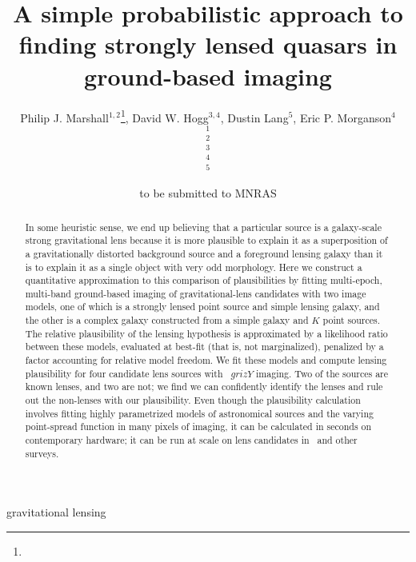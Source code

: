 \documentclass[useAMS,usenatbib]{mn2e}
\title[Finding lensed quasars]
{A simple probabilistic approach to finding 
strongly lensed quasars in ground-based imaging}
\author[]{%
  Philip J. Marshall$^{1,2}$\thanks{\pjmemail},
  David W. Hogg$^{3,4}$,
  Dustin Lang$^{5}$,
  Eric P. Morganson$^{4}$ 
  \medskip\\
  $^1$\oxford\\
  $^2$\kipac\\
  $^3$\nyu\\
  $^4$\mpia\\
  $^5$\cmu
}
\begin{document}
             
\date{to be submitted to MNRAS}
             
\pagerange{\pageref{firstpage}--\pageref{lastpage}}

\maketitle           

\label{firstpage}


\begin{abstract}
In some heuristic sense, we end up believing that a particular source
is a galaxy-scale strong gravitational lens because it is more
plausible to explain it as a superposition of a gravitationally
distorted background source and a foreground lensing galaxy than it is
to explain it as a single object with very odd morphology.  Here we
construct a quantitative approximation to this comparison of
plausibilities by fitting multi-epoch, multi-band ground-based imaging
of gravitational-lens candidates with two image models, one of which
is a strongly lensed point source and simple lensing galaxy, and the
other is a complex galaxy constructed from a simple galaxy and $K$
point sources.  The relative plausibility of the lensing hypothesis is
approximated by a likelihood ratio between these models, evaluated at
best-fit (that is, not marginalized), penalized by a factor accounting
for relative model freedom.  We fit these models and compute lensing
plausibility for four candidate lens sources with \panstarrs\ $grizY$
imaging.  Two of the sources are known lenses, and two are not; we
find we can confidently identify the lenses and rule out the
non-lenses with our plausibility.  Even though the plausibility
calculation involves fitting highly parametrized models of
astronomical sources and the varying point-spread function in many
pixels of imaging, it can be calculated in seconds on contemporary
hardware; it can be run at scale on lens candidates in \panstarrs\ and
other surveys.
\end{abstract}


\begin{keywords}
  gravitational lensing
\end{keywords}

\setcounter{footnote}{1}
\end{document}

